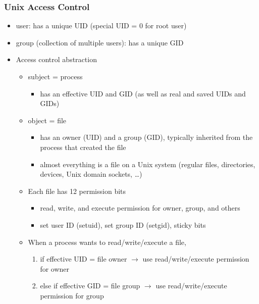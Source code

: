\documentclass[final]{article}
\begin{document}
\subsubsection*{Unix Access Control}
\begin{itemize}[nosep]
    \item user: has a unique UID (special UID = 0 for root user)
    \item group (collection of multiple users): has a unique GID
    \item Access control abstraction
          \begin{itemize}[nosep]
              \item subject = process
                    \begin{itemize}[nosep]
                        \item has an effective UID and GID (as well as real and saved UIDs and GIDs)
                    \end{itemize}
              \item object = file
                    \begin{itemize}[nosep]
                        \item has an owner (UID) and a group (GID), typically inherited from the process that created the file
                        \item almost everything is a file on a Unix system (regular files, directories, devices, Unix domain sockets, \dots)
                    \end{itemize}
              \item Each file has 12 permission bits
                    \begin{itemize}[nosep]
                        \item read, write, and execute permission for owner, group, and others
                        \item set user ID (setuid), set group ID (setgid), sticky bits
                    \end{itemize}
              \item When a process wants to read/write/execute a file,
                    \begin{enumerate}[nosep]
                        \item if effective UID = file owner $\rightarrow$ use read/write/execute permission for owner
                        \item else if effective GID = file group $\rightarrow$ use read/write/execute permission for group

\end{enumerate}
\end{itemize}
\end{itemize}
\end{document}
